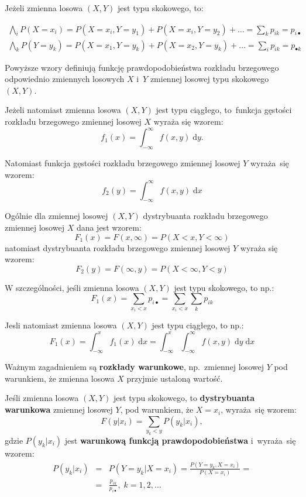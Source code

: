 \documentclass[10pt,a4paper]{article}
\newcommand{\dd}{\; \mathrm{d}}
\numberwithin{equation}{subsection}
\begin{document}
Jeżeli zmienna losowa $(X,Y)$ jest typu skokowego, to:

\begin{eqnarray}
  \bigwedge_i P(X = x_i) = P(X = x_i, Y = y_1) + P(X = x_i, Y = y_2) + \dotsc = \sum_kp_{ik} = p_{i\bullet} \\
  \bigwedge_k P(Y = y_k) = P(X = x_1, Y = y_k) + P(X = x_2, Y = y_k) + \dotsc = \sum_i p_{ik} = p_{\bullet k}
\end{eqnarray}

Powyższe wzory definiują funkcję prawdopodobieństwa rozkładu brzegowego
odpowiednio zmiennych losowych $X$ i~$Y$ zmiennej losowej typu skokowego $(X,Y)$.

Jeżeli natomiast zmienna losowa $(X,Y)$ jest typu ciągłego, to~funkcja gęstości
rozkładu brzegowego zmiennej losowej $X$ wyraża się wzorem:
\[
  f_1(x) = \int_{-\infty}^{\infty} f(x, y) \dd{y}.
\]

Natomiast funkcja gęstości rozkładu brzegowego zmiennej losowej $Y$ wyraża~się
wzorem:
\[
  f_2(y) = \int_{-\infty}^{\infty} f(x, y) \dd{x}
\]

Ogólnie dla zmiennej losowej $(X,Y)$ dystrybuanta rozkładu brzegowego zmiennej
losowej $X$ dana jest wzorem:
\[
  F_1(x) = F(x, \infty) = P(X < x, Y < \infty)
\]
natomiast dystrybuanta rozkładu brzegowego zmiennej losowej $Y$ wyraża się
wzorem:
\[
  F_2(y) = F(\infty, y) = P(X < \infty, Y < y)
\]

W szczególności, jeśli zmienna losowa $(X,Y)$ jest typu skokowego, to np.:
\[
  F_1(x) = \sum_{x_i<x} p_{i\bullet} = \sum_{x_i<x} \sum_k p_{ik}
\]

Jesli natomiast zmienna losowa $(X,Y)$ jest typu ciągłego, to np.:
\[
  F_1(x) = \int_{-\infty}^x f_1(x) \dd{x} = \int_{-\infty}^x \int_{-\infty}^{\infty} f(x,y) \dd{y}\dd{x}
\]

Ważnym zagadnieniem są \textbf{rozkłady warunkowe}, np.~zmiennej losowej $Y$
pod warunkiem, że zmienna losowa $X$ przyjmie ustaloną wartość.

Jeśli zmienna losowa $(X,Y)$ jest typu skokowego, to \textbf{dystrybuanta
  warunkowa} zmiennej losowej $Y$, pod warunkiem, że $X=x_i$, wyraża~się wzorem:
\begin{equation}
  F(y|x_i) = \sum_{y_k < y} P(y_k|x_i),
\end{equation}
gdzie $P(y_k|x_i)$ jest \textbf{warunkową funkcją prawdopodobieństwa}
i~wyraża~się wzorem:
\begin{eqnarray}
  P(y_k|x_i) &=& P(Y = y_k|X = x_i) = \frac{P(Y = y_k,X = x_i)}{P(X = x_i)} = \\
  \nonumber
  &=& \frac{p_{ik}}{p_{i\bullet}},\;k=1,2,\dotsc
\end{eqnarray}
\end{document}
